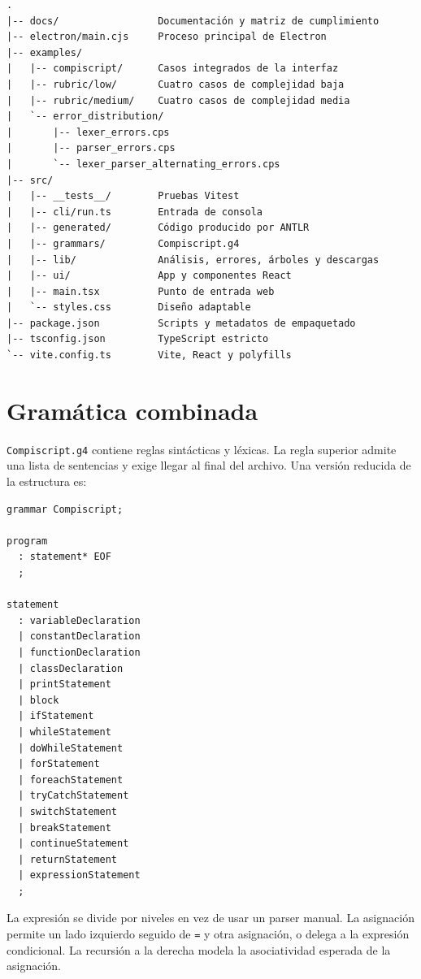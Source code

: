 \documentclass[12pt,letterpaper,oneside]{report}
\newcommand{\archivo}[1]{\texttt{#1}}
\begin{document}
\begin{verbatim}
.
|-- docs/                 Documentación y matriz de cumplimiento
|-- electron/main.cjs     Proceso principal de Electron
|-- examples/
|   |-- compiscript/      Casos integrados de la interfaz
|   |-- rubric/low/       Cuatro casos de complejidad baja
|   |-- rubric/medium/    Cuatro casos de complejidad media
|   `-- error_distribution/
|       |-- lexer_errors.cps
|       |-- parser_errors.cps
|       `-- lexer_parser_alternating_errors.cps
|-- src/
|   |-- __tests__/        Pruebas Vitest
|   |-- cli/run.ts        Entrada de consola
|   |-- generated/        Código producido por ANTLR
|   |-- grammars/         Compiscript.g4
|   |-- lib/              Análisis, errores, árboles y descargas
|   |-- ui/               App y componentes React
|   |-- main.tsx          Punto de entrada web
|   `-- styles.css        Diseño adaptable
|-- package.json          Scripts y metadatos de empaquetado
|-- tsconfig.json         TypeScript estricto
`-- vite.config.ts        Vite, React y polyfills
\end{verbatim}

\vspace{5cm}

\section{Gramática combinada}

\archivo{Compiscript.g4} contiene reglas sintácticas y léxicas. La regla superior
admite una lista de sentencias y exige llegar al final del archivo. Una versión
reducida de la estructura es:

\begin{verbatim}
grammar Compiscript;

program
  : statement* EOF
  ;

statement
  : variableDeclaration
  | constantDeclaration
  | functionDeclaration
  | classDeclaration
  | printStatement
  | block
  | ifStatement
  | whileStatement
  | doWhileStatement
  | forStatement
  | foreachStatement
  | tryCatchStatement
  | switchStatement
  | breakStatement
  | continueStatement
  | returnStatement
  | expressionStatement
  ;
\end{verbatim}

La expresión se divide por niveles en vez de usar un parser manual. La asignación
permite un lado izquierdo seguido de \archivo{=} y otra asignación, o delega a la
expresión condicional. La recursión a la derecha modela la asociatividad esperada de
la asignación.
\end{document}
